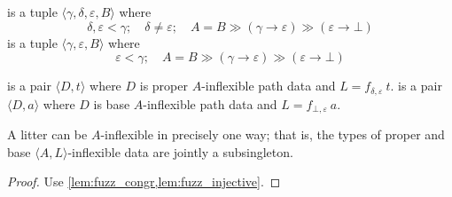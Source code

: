 \begin{definition}
     is a tuple \( \langle \gamma, \delta, \varepsilon, B \rangle \) where
    \[ \delta, \varepsilon < \gamma;\quad \delta \neq \varepsilon; \quad A = B \gg (\gamma \to \varepsilon) \gg (\varepsilon \to \bot) \]
     is a tuple \( \langle \gamma, \varepsilon, B \rangle \) where
    \[ \varepsilon < \gamma; \quad A = B \gg (\gamma \to \varepsilon) \gg (\varepsilon \to \bot) \]
\end{definition}
\begin{definition}
     is a pair \( \langle D, t \rangle \) where \( D \) is proper \( A \)-inflexible path data and \( L = f_{\delta,\varepsilon}\ t \).
     is a pair \( \langle D, a \rangle \) where \( D \) is base \( A \)-inflexible path data and \( L = f_{\bot,\varepsilon}\ a \).
\end{definition}
\begin{lemma}
    A litter can be \( A \)-inflexible in precisely one way; that is, the types of proper and base \( \langle A, L \rangle \)-inflexible data are jointly a subsingleton.
\end{lemma}
\begin{proof}
    Use \cref{lem:fuzz_congr,lem:fuzz_injective}.
\end{proof}
